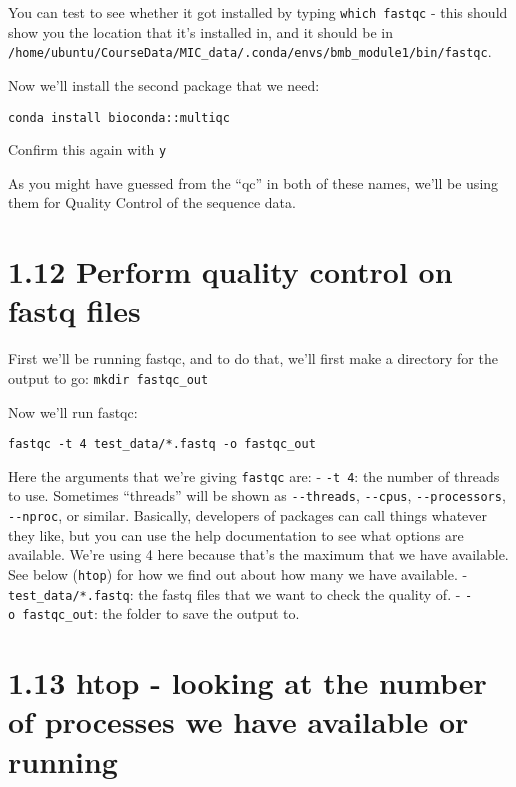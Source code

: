 \documentclass[
]{book}
\begin{document}
You can test to see whether it got installed by typing \texttt{which\ fastqc} - this should show you the location that it's installed in, and it should be in \texttt{/home/ubuntu/CourseData/MIC\_data/.conda/envs/bmb\_module1/bin/fastqc}.

Now we'll install the second package that we need:

\begin{verbatim}
conda install bioconda::multiqc
\end{verbatim}

Confirm this again with \texttt{y}

As you might have guessed from the ``qc'' in both of these names, we'll be using them for Quality Control of the sequence data.

\section{1.12 Perform quality control on fastq files}\label{perform-quality-control-on-fastq-files}

First we'll be running fastqc, and to do that, we'll first make a directory for the output to go: \texttt{mkdir\ fastqc\_out}

Now we'll run fastqc:

\begin{verbatim}
fastqc -t 4 test_data/*.fastq -o fastqc_out
\end{verbatim}

Here the arguments that we're giving \texttt{fastqc} are:
- \texttt{-t\ 4}: the number of threads to use. Sometimes ``threads'' will be shown as \texttt{-\/-threads}, \texttt{-\/-cpus}, \texttt{-\/-processors}, \texttt{-\/-nproc}, or similar. Basically, developers of packages can call things whatever they like, but you can use the help documentation to see what options are available. We're using 4 here because that's the maximum that we have available. See below (\texttt{htop}) for how we find out about how many we have available.
- \texttt{test\_data/*.fastq}: the fastq files that we want to check the quality of.
- \texttt{-o\ fastqc\_out}: the folder to save the output to.

\section{1.13 htop - looking at the number of processes we have available or running}\label{htop---looking-at-the-number-of-processes-we-have-available-or-running}
\end{document}
